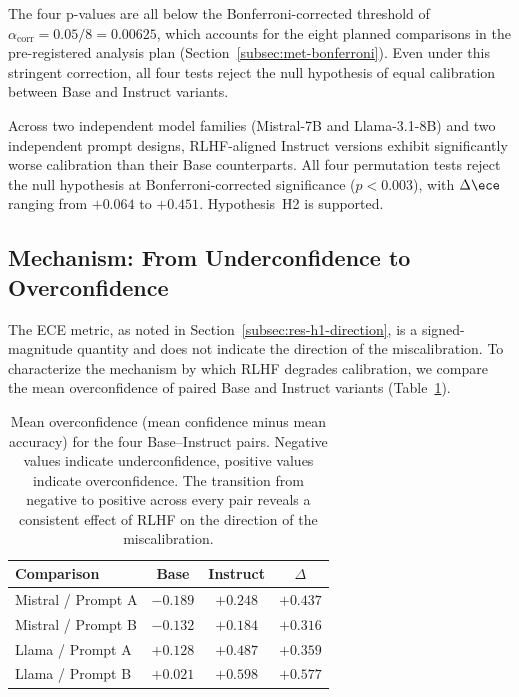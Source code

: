 The four p-values are all below the Bonferroni-corrected threshold of 
$\alpha_{\text{corr}} = 0.05 / 8 = 0.00625$, which accounts for the eight 
planned comparisons in the pre-registered analysis plan 
(Section~\ref{subsec:met-bonferroni}). Even under this stringent 
correction, all four tests reject the null hypothesis of equal 
calibration between Base and Instruct variants.

\begin{finding}
    Across two independent model families (Mistral-7B and Llama-3.1-8B) 
    and two independent prompt designs, RLHF-aligned Instruct versions 
    exhibit significantly worse calibration than their Base counterparts. 
    All four permutation tests reject the null hypothesis at 
    Bonferroni-corrected significance ($p < 0.003$), with $\Delta\ece$ 
    ranging from $+0.064$ to $+0.451$. Hypothesis~H2 is supported.
\end{finding}

\subsection{Mechanism: From Underconfidence to Overconfidence}
\label{subsec:res-h2-mechanism}

The ECE metric, as noted in Section~\ref{subsec:res-h1-direction}, is a 
signed-magnitude quantity and does not indicate the direction of the 
miscalibration. To characterize the mechanism by which RLHF degrades 
calibration, we compare the mean overconfidence of paired Base and 
Instruct variants (Table~\ref{tab:res-h2-mechanism}).

\begin{table}[htbp]
    \centering
    \caption{Mean overconfidence (mean confidence minus mean accuracy) 
        for the four Base--Instruct pairs. Negative values indicate 
        underconfidence, positive values indicate overconfidence. The 
        transition from negative to positive across every pair reveals a 
        consistent effect of RLHF on the direction of the miscalibration.}
    \label{tab:res-h2-mechanism}
    \small
    \begin{tabular}{@{}lccc@{}}
        \toprule
        \textbf{Comparison} & 
        \textbf{Base} & 
        \textbf{Instruct} & 
        \boldmath$\Delta$ \\
        \midrule
        Mistral / Prompt A & $-0.189$ & $+0.248$ & $+0.437$ \\
        Mistral / Prompt B & $-0.132$ & $+0.184$ & $+0.316$ \\
        Llama / Prompt A   & $+0.128$ & $+0.487$ & $+0.359$ \\
        Llama / Prompt B   & $+0.021$ & $+0.598$ & $+0.577$ \\
        \bottomrule
    \end{tabular}
\end{table}

